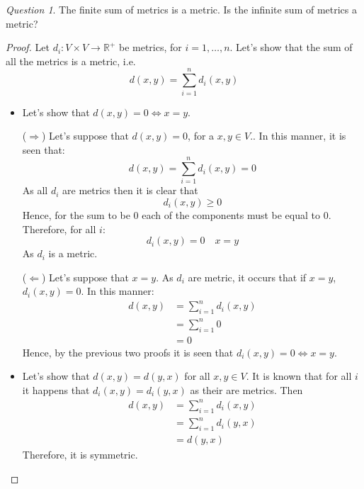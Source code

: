 \documentclass[11pt]{article}
\theoremstyle{definition}
\theoremstyle{remark}
\theoremstyle{remark}
\theoremstyle{remark}
\newtheorem*{question}{Question}
\newcommand{\R}{{\mathbb{R}}}
\begin{document}
\begin{question}
  The finite sum of metrics is a metric. Is the infinite sum of metrics a
  metric?
\end{question}
\begin{proof}
  Let $d_{i}: V \times V \rightarrow \R^{+}$ be metrics, for $i = 1,\ldots,n$.
  Let's show that the sum of all the metrics is a metric, i.e.
  \begin{equation*}
    d(x, y) = \sum_{i=1}^{n}d_{i}(x,y)
  \end{equation*}
  \begin{itemize}
    \item Let's show that $d(x,y) = 0 \iff x = y$.

      ($\Rightarrow$) Let's suppose that $d(x,y) = 0$, for a $x,y \in V$.. In
      this manner, it is seen that:
      \begin{equation*}
        d(x,y) = \sum_{i = 1}^{n} d_{i}(x,y) = 0
      \end{equation*}
      As all $d_{i}$ are metrics then it is clear that
      \begin{equation*}
        d_{i}(x,y) \ge 0
      \end{equation*}
      Hence, for the sum to be 0 each of the components must be equal to 0.
      Therefore, for all $i$:
      \begin{equation*}
        d_{i}(x, y) = 0 \quad x = y
      \end{equation*}
      As $d_{i}$ is a metric.

      ($\Leftarrow$) Let's suppose that $x = y$. As $d_{i}$ are metric, it
      occurs that if $x = y$, $d_{i}(x, y) = 0$. In this manner:
      \begin{align*}
        d(x,y) &= \sum_{i = 1}^{n}d_{i}(x, y) \\
               &= \sum_{i=1}^{n} 0 \\
               &= 0
      \end{align*}
      Hence, by the previous two proofs it is seen that
      $d_{i}(x,y) = 0 \iff x = y$.

    \item Let's show that $d(x,y) = d(y, x)$ for all $x, y \in V$. It is known
      that for all $i$ it happens that $d_{i}(x,y) = d_{i}(y,x)$ as their are
      metrics. Then
      \begin{align*}
        d(x,y) &= \sum_{i=1}^{n} d_{i}(x, y) \\
               &= \sum_{i=1}^{n} d_{i}(y, x) \\
               &= d(y, x)
      \end{align*}
      Therefore, it is symmetric.


\end{itemize}
\end{proof}
\end{document}
